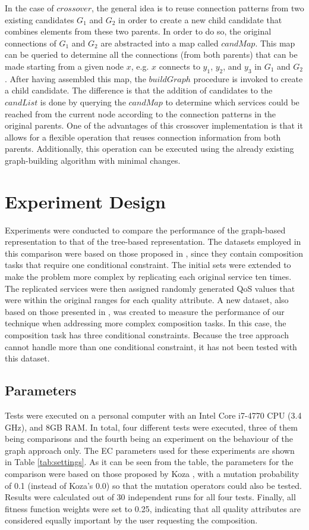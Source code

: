 In the case of $crossover$, the general idea is to reuse connection patterns from two existing candidates $G_1$ and $G_2$ in order to create a new child candidate that combines elements from these two parents. In order to do so, the original connections of $G_1$ and $G_2$ are abstracted into a map called $candMap$. This map can be queried to determine all the connections (from both parents) that can be made starting from a given node $x$, e.g. $x$ connects to $y_1$, $y_2$, and $y_3$ in $G_1$ and $G_2$. After having assembled this map, the $buildGraph$ procedure is invoked to create a child candidate. The difference is that the addition of candidates to the $candList$ is done by querying the $candMap$ to determine which services could be reached from the current node according to the connection patterns in the original parents. One of the advantages of this crossover implementation is that it allows for a flexible operation that reuses connection information from both parents. Additionally, this operation can be executed using the already existing graph-building algorithm with minimal changes.

\section{Experiment Design}\label{experimentDesign}
Experiments were conducted to compare the performance of the graph-based representation to that of the tree-based representation. The datasets employed in this comparison were based on those proposed in \cite{sawczuk2015gp}, since they contain composition tasks that require one conditional constraint. The initial sets were extended to make the problem more complex by replicating each original service ten times. The replicated services were then assigned randomly generated QoS values that were within the original ranges for each quality attribute. A new dataset, also based on those presented in \cite{sawczuk2015gp}, was created to measure the performance of our technique when addressing more complex composition tasks. In this case, the composition task has three conditional constraints. Because the tree approach cannot handle more than one conditional constraint, it has not been tested with this dataset.

\subsection{Parameters}
Tests were executed on a personal computer with an Intel Core i7-4770 CPU (3.4 GHz), and 8GB RAM. In total, four different tests were executed, three of them being comparisons and the fourth being an experiment on the behaviour of the graph approach only. The EC parameters used for these experiments are shown in Table \ref{tab:settings}. As it can be seen from the table, the parameters for the comparison were based on those proposed by Koza \cite{koza1992genetic}, with a mutation probability of 0.1 (instead of Koza's 0.0) so that the mutation operators could also be tested. Results were calculated out of 30 independent runs for all four tests. Finally, all fitness function weights were set to 0.25, indicating that all quality attributes are considered equally important by the user requesting the composition.


